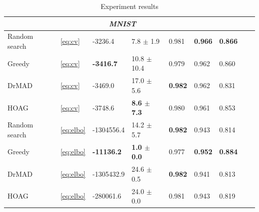 \documentclass[smallcondensed]{svjour3}
\begin{document}
\begin{table}
\begin{tabularx}{\textwidth}{ |X|p{0.75cm}|X|X|p{1cm}|X|X|X|X|}
\multicolumn{7}{|c|}{\textit{MNIST}}  \\
\hline
Random search & ~\eqref{eq:cv} & -3236.4  & 7.8 $\pm$ 1.9  &   0.981 & \bf 0.966 & \bf 0.866 \\
\hline
Greedy & ~\eqref{eq:cv} & \bf -3416.7 & 10.8 $\pm$ 10.4 & 0.979 & 0.962 & 0.860\\
\hline
DrMAD & ~\eqref{eq:cv} & -3469.0 & 17.0 $\pm$ 5.6 & \bf  0.982 & 0.962 & 0.831\\
\hline
HOAG & ~\eqref{eq:cv} & -3748.6 & \bf 8.6 $\pm$ 7.3&   0.980 &  0.961  & 0.853 \\
\hline
Random search & ~\eqref{eq:elbo} & -1304556.4 &  14.2 $\pm$ 5.7 &  \bf 0.982 & 0.943 & 0.814 \\
\hline
Greedy & ~\eqref{eq:elbo} & \bf -11136.2 & \bf 1.0 $\pm$ 0.0  &  0.977 & \bf 0.952 & \bf 0.884\\
\hline
DrMAD & ~\eqref{eq:elbo} & -1305432.9 & 24.6 $\pm$ 0.5  & \bf 0.982 & 0.941 & 0.813 \\
\hline
HOAG & ~\eqref{eq:elbo} &  -280061.6 & 24.0 $\pm$ 0.0  & 0.981 & 0.943 & 0.819\\
\hline


\hline
\end{tabularx}
\caption{Experiment results}
\label{table:table}
\end{table}
\end{document}
